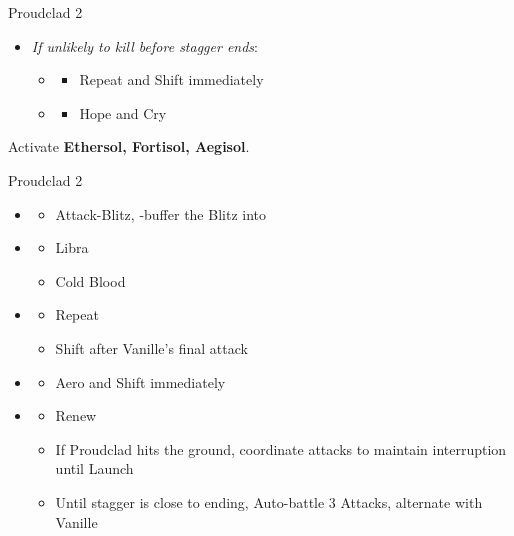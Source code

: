 \begin{paracol}{2}
\begin{battle}{Proudclad 2}
\begin{itemize}
			\item \textit{If unlikely to kill before stagger ends}:
			      \begin{itemize}
				      \item \first
				            \begin{itemize}
					            \item Repeat and Shift immediately
				            \end{itemize}
				      \item \second
				            \begin{itemize}
					            \item Hope and Cry
				            \end{itemize}
			      \end{itemize}
		\end{itemize}
\end{battle}
\switchcolumn
Activate \textbf{Ethersol, Fortisol, Aegisol}.
\begin{battle}{Proudclad 2}
\begin{itemize}
    \item \second
    \begin{itemize}
        \item Attack-Blitz, \rav-buffer the Blitz into
    \end{itemize}
    \item \sixth
    \begin{itemize}
        \item Libra
        \item Cold Blood
    \end{itemize}
    \item \fifth
    \begin{itemize}
        \item Repeat
        \item Shift after Vanille's final attack
    \end{itemize}
    \item \first
    \begin{itemize}
        \item Aero and Shift immediately
    \end{itemize}
    \item \second
    \begin{itemize}
        \item Renew
        \item If Proudclad hits the ground, coordinate attacks to maintain interruption until Launch
        \item Until stagger is close to ending, Auto-battle 3 Attacks, alternate with Vanille

\end{itemize}
\end{itemize}
\end{battle}
\end{paracol}
